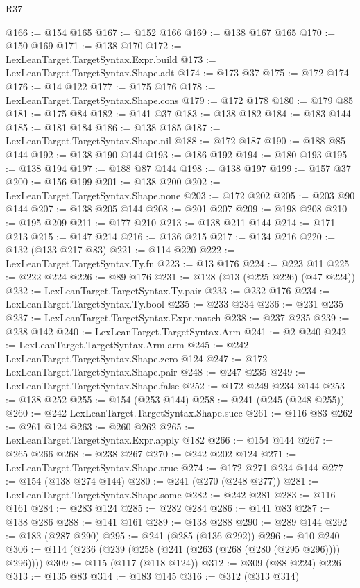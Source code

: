 \begin{lexlean}{R37}
\begin{coremodule}
@166 := @154 @165
@167 := @152 @166
@169 := @138 @167 @165
@170 := @150 @169
@171 := @138 @170
@172 := LexLeanTarget.TargetSyntax.Expr.build
@173 := LexLeanTarget.TargetSyntax.Shape.adt
@174 := @173 @37
@175 := @172 @174
@176 := @14 @122
@177 := @175 @176
@178 := LexLeanTarget.TargetSyntax.Shape.cons
@179 := @172 @178
@180 := @179 @85
@181 := @175 @84
@182 := @141 @37
@183 := @138 @182
@184 := @183 @144
@185 := @181 @184
@186 := @138 @185
@187 := LexLeanTarget.TargetSyntax.Shape.nil
@188 := @172 @187
@190 := @188 @85 @144
@192 := @138 @190 @144
@193 := @186 @192
@194 := @180 @193
@195 := @138 @194
@197 := @188 @87 @144
@198 := @138 @197
@199 := @157 @37
@200 := @156 @199
@201 := @138 @200
@202 := LexLeanTarget.TargetSyntax.Shape.none
@203 := @172 @202
@205 := @203 @90 @144
@207 := @138 @205 @144
@208 := @201 @207
@209 := @198 @208
@210 := @195 @209
@211 := @177 @210
@213 := @138 @211 @144
@214 := @171 @213
@215 := @147 @214
@216 := @136 @215
@217 := @134 @216
@220 := @132 (@133 @217 @83)
@221 := @114 @220
@222 := LexLeanTarget.TargetSyntax.Ty.fn
@223 := @13 @176
@224 := @223 @11
@225 := @222 @224
@226 := @89 @176
@231 := @128 (@13 (@225 @226) (@47 @224))
@232 := LexLeanTarget.TargetSyntax.Ty.pair
@233 := @232 @176
@234 := LexLeanTarget.TargetSyntax.Ty.bool
@235 := @233 @234
@236 := @231 @235
@237 := LexLeanTarget.TargetSyntax.Expr.match
@238 := @237 @235
@239 := @238 @142
@240 := LexLeanTarget.TargetSyntax.Arm
@241 := @2 @240
@242 := LexLeanTarget.TargetSyntax.Arm.arm
@245 := @242 LexLeanTarget.TargetSyntax.Shape.zero @124
@247 := @172 LexLeanTarget.TargetSyntax.Shape.pair
@248 := @247 @235
@249 := LexLeanTarget.TargetSyntax.Shape.false
@252 := @172 @249 @234 @144
@253 := @138 @252
@255 := @154 (@253 @144)
@258 := @241 (@245 (@248 @255))
@260 := @242 LexLeanTarget.TargetSyntax.Shape.succ
@261 := @116 @83
@262 := @261 @124
@263 := @260 @262
@265 := LexLeanTarget.TargetSyntax.Expr.apply @182
@266 := @154 @144
@267 := @265 @266
@268 := @238 @267
@270 := @242 @202 @124
@271 := LexLeanTarget.TargetSyntax.Shape.true
@274 := @172 @271 @234 @144
@277 := @154 (@138 @274 @144)
@280 := @241 (@270 (@248 @277))
@281 := LexLeanTarget.TargetSyntax.Shape.some
@282 := @242 @281
@283 := @116 @161
@284 := @283 @124
@285 := @282 @284
@286 := @141 @83
@287 := @138 @286
@288 := @141 @161
@289 := @138 @288
@290 := @289 @144
@292 := @183 (@287 @290)
@295 := @241 (@285 (@136 @292))
@296 := @10 @240
@306 := @114 (@236 (@239 (@258 (@241 (@263 (@268 (@280 (@295 @296)))) @296))))
@309 := @115 (@117 (@118 @124))
@312 := @309 (@88 @224) @226
@313 := @135 @83
@314 := @183 @145
@316 := @312 (@313 @314)

\end{coremodule}
\end{lexlean}
